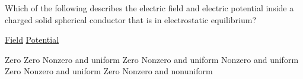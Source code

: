 \begin{questions}\setcounter{question}{14}\question
Which of the following describes the electric field and electric potential inside a charged solid spherical conductor that is in electrostatic equilibrium?

\tabto{0.75cm}\underline{Field}
\tabto{5.00cm}\underline{Potential}

\begin{choices}
\choice Zero                \tabto{4.25cm} Zero
\choice Nonzero and uniform \tabto{4.25cm} Zero
\choice Nonzero and uniform \tabto{4.25cm} Nonzero and uniform
\choice Zero                \tabto{4.25cm} Nonzero and uniform
\choice Zero                \tabto{4.25cm} Nonzero and nonuniform
\end{choices}\end{questions}

